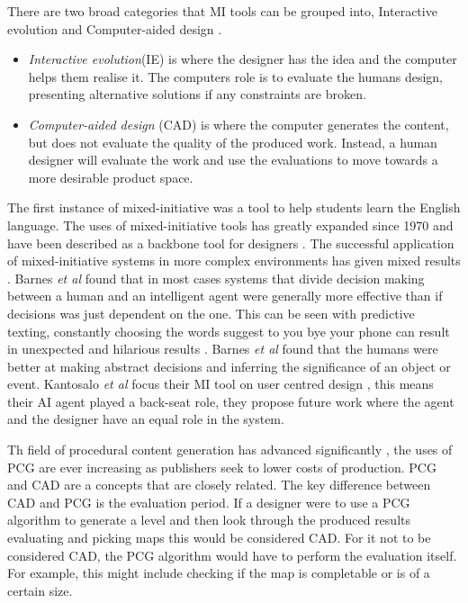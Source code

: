 \documentclass[journal]{IEEEtran}
\begin{document}
There are two broad categories that MI tools can be grouped into, Interactive evolution and Computer-aided design \cite{liapis2016mixed}. 
\begin{itemize}
    \item \textit{Interactive evolution}(IE) is where the designer has the idea and the computer helps them realise it. The computers role is to evaluate the humans design, presenting alternative solutions if any constraints are broken. 
    
    \item \textit{Computer-aided design} (CAD) is where the computer generates the content, but does not evaluate the quality of the produced work. Instead, a human designer will evaluate the work and use the evaluations to move towards a more desirable product space.
\end{itemize}

The first instance of mixed-initiative was a tool to help students learn the English language. The uses of mixed-initiative tools has greatly expanded since 1970 and have been described as a backbone tool for designers \cite{alvarez2018fostering}. The  successful application of mixed-initiative systems in more complex environments has given mixed results \cite{barnes2015designing}. Barnes \textit{et al}\cite{barnes2015designing} found that in most cases systems that divide decision making between a human and an intelligent agent were generally more effective than if decisions was just dependent on the one. This can be seen with predictive texting, constantly choosing the words suggest to you bye your phone can result in unexpected and hilarious results \cite{quicktype}.  Barnes \textit{et al}\cite{barnes2015designing} found that the humans were better at making abstract decisions and inferring the significance of an object or event. Kantosalo \textit{et al}\cite{kantosalo2014isolation} focus their MI tool on user centred design , this means their AI agent played a back-seat role, they propose future work where the agent and the designer have an equal role in the system.

Th field of procedural content generation has advanced significantly \cite{van2013designing}, the uses of PCG are ever increasing as publishers seek to lower costs of production\cite{doherty2005mixed, font2016constrained}. PCG and CAD are a concepts that are closely related. The key difference between CAD and PCG is the evaluation period. If a designer were to use a PCG algorithm to generate a level and then look through the produced results evaluating and picking maps this would be considered CAD\cite{liapis2016mixed}. For it not to be considered CAD, the PCG algorithm would have to perform the evaluation itself. For example, this might include checking if the map is completable or is of a certain size. 
\end{document}
